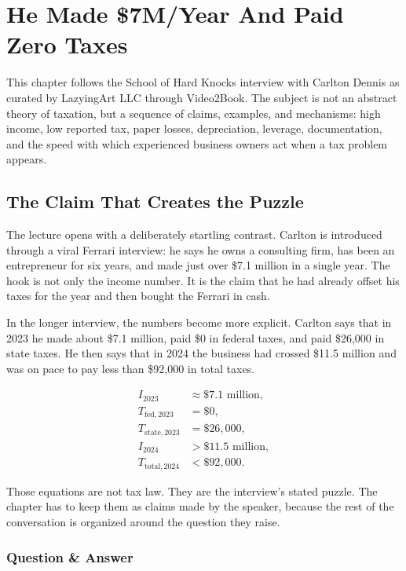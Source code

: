 \chapter{He Made \$7M/Year And Paid Zero Taxes}

This chapter follows the School of Hard Knocks interview with Carlton Dennis as curated by LazyingArt LLC through Video2Book. The subject is not an abstract theory of taxation, but a sequence of claims, examples, and mechanisms: high income, low reported tax, paper losses, depreciation, leverage, documentation, and the speed with which experienced business owners act when a tax problem appears.

\section{The Claim That Creates the Puzzle}

The lecture opens with a deliberately startling contrast. Carlton is introduced through a viral Ferrari interview: he says he owns a consulting firm, has been an entrepreneur for six years, and made just over \$7.1 million in a single year. The hook is not only the income number. It is the claim that he had already offset his taxes for the year and then bought the Ferrari in cash.

In the longer interview, the numbers become more explicit. Carlton says that in 2023 he made about \$7.1 million, paid \$0 in federal taxes, and paid \$26,000 in state taxes. He then says that in 2024 the business had crossed \$11.5 million and was on pace to pay less than \$92,000 in total taxes.

\begin{align}
I_{2023} &\approx \$7.1\text{ million},\\
T_{\mathrm{fed},2023} &= \$0,\\
T_{\mathrm{state},2023} &= \$26{,}000,\\
I_{2024} &> \$11.5\text{ million},\\
T_{\mathrm{total},2024} &< \$92{,}000.
\end{align}

Those equations are not tax law. They are the interview's stated puzzle. The chapter has to keep them as claims made by the speaker, because the rest of the conversation is organized around the question they raise.

\subsection{Question \& Answer}

